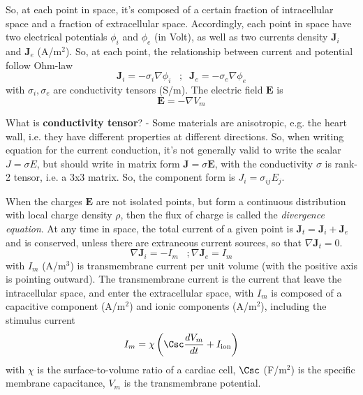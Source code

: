 So, at each point in space, it's composed of a certain fraction of intracellular
space and a fraction of extracellular space. Accordingly, each point in space
have two electrical potentials $\phi_i$ and $\phi_e$ (in Volt), as well as two
currents density $\mathbf{J}_i$ and $\mathbf{J}_e$ (A/m$^2$). So, at each point, the relationship
between current and potential follow Ohm-law
\begin{equation}
\mathbf{J}_i = -\sigma_i \nabla \phi_i	\;\;\;;\;\; \mathbf{J}_e=-\sigma_e \nabla \phi_e
\end{equation}
with $\sigma_i, \sigma_e$ are conductivity tensors (S/m). The electric field
$\mathbf{E}$ is
\begin{equation}
\mathbf{E} = -\nabla V_m
\end{equation}

\begin{framed}
What is {\bf conductivity tensor}? - Some materials are anisotropic, e.g. the
heart wall, i.e. they have different properties at different directions. So,
when writing equation for the current conduction, it's not generally valid to
write the scalar $J=\sigma E$, but should write in matrix form
$\mathbf{J}=\sigma \mathbf{E}$, with the conductivity $\sigma$ is rank-2 tensor,
i.e. a 3x3 matrix. So, the component form is $J_i=\sigma_{ij}E_j$.
\end{framed}

When the charges $\mathbf{E}$ are not isolated points, but form a continuous
distribution with local charge density $\rho$, then the flux of charge is called
the {\it divergence equation}. At any time in space, the total current of a
given point is $\mathbf{J}_t=\mathbf{J}_i+\mathbf{J}_e$ and is conserved, unless
there are extraneous current sources, so that $\nabla \mathbf{J}_t=0$.
\begin{equation}
\nabla \mathbf{J}_i = -I_m \;\;\;; \nabla \mathbf{J}_e = I_m
\end{equation}
with $I_m$ (A/m$^3$) is transmembrane current per unit volume (with the positive
axis is pointing outward). The transmembrane current is the current that leave the intracellular space, and
enter the extracellular space, with $I_m$ is composed of a capacitive component
(A/m$^2$) and ionic components (A/m$^2$), including the stimulus current
\begin{equation}
I_m = \chi \left( \Csc \frac{dV_m}{dt} + I_\ion \right)
\end{equation}
with $\chi$ is the surface-to-volume ratio of a cardiac cell, $\Csc$
(F/m$^2$) is the specific membrane capacitance, $V_m$ is the transmembrane
potential.

